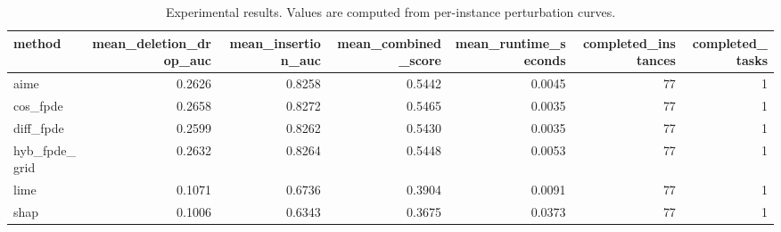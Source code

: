 \begin{table}[t]
\caption{Experimental results. Values are computed from per-instance perturbation curves.}
\label{tab:main_results_computed}
\centering
\begin{tabular}{lrrrrrr}
\toprule
method & mean\_deletion\_drop\_auc & mean\_insertion\_auc & mean\_combined\_score & mean\_runtime\_seconds & completed\_instances & completed\_tasks \\
\midrule
aime & 0.2626 & 0.8258 & 0.5442 & 0.0045 & 77 & 1 \\
cos\_fpde & 0.2658 & 0.8272 & 0.5465 & 0.0035 & 77 & 1 \\
diff\_fpde & 0.2599 & 0.8262 & 0.5430 & 0.0035 & 77 & 1 \\
hyb\_fpde\_grid & 0.2632 & 0.8264 & 0.5448 & 0.0053 & 77 & 1 \\
lime & 0.1071 & 0.6736 & 0.3904 & 0.0091 & 77 & 1 \\
shap & 0.1006 & 0.6343 & 0.3675 & 0.0373 & 77 & 1 \\
\bottomrule
\end{tabular}

\end{table}
